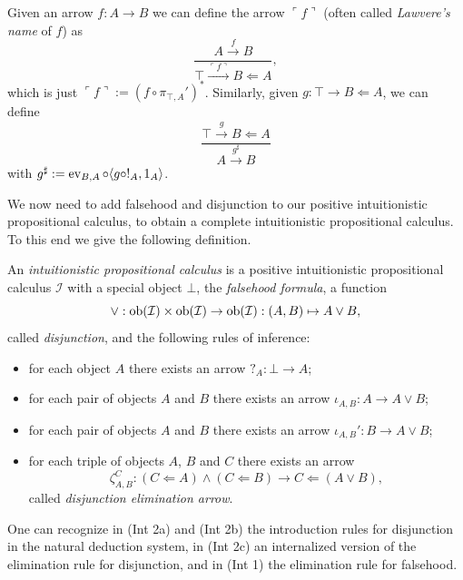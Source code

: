 \begin{example}
    Given an arrow $f : A \to B$ we can define the arrow $\ulcorner f \urcorner$ (often called \emph{Lawvere's name} of $f$) as\label{idx:lawvere-name}
    \[ \frac{A \xrightarrow{f} B}{\top \xrightarrow{\ulcorner f \urcorner} B \Leftarrow A}, \]
    which is just $\ulcorner f \urcorner := (f \circ \pi_{\top,A}')^*$. Similarly, given $g : \top \to B \Leftarrow A$, we can define
    \[ \frac{\top \xrightarrow{g} B \Leftarrow A}{A \xrightarrow{g^\sharp} B} \]
    with $g^\sharp := \operatorname{ev}_{B,A} \circ \langle g \circ !_A,1_A\rangle$.\label{idx:global-evaluation}
\end{example}

We now need to add falsehood and disjunction to our positive intuitionistic propositional calculus, to obtain a complete intuitionistic propositional calculus.
To this end we give the following definition.

\begin{definition}
    An \emph{intuitionistic propositional calculus} is a positive intuitionistic propositional calculus $\mathcal I$ with a special object $\bot$, the \emph{falsehood formula}, a function
    \[ \lor : \operatorname{ob}(\mathcal I)\times\operatorname{ob}(\mathcal I) \to \operatorname{ob}(\mathcal I) : (A,B) \mapsto A \lor B, \]
    called \emph{disjunction}, and the following rules of inference:
    \begin{itemize}
        \item[(\textnormal{Int 1})] for each object $A$ there exists an arrow $?_A : \bot \to A$;
        \item[(\textnormal{Int 2a})] for each pair of objects $A$ and $B$ there exists an arrow $\iota_{A,B} : A \to A \lor B$;
        \item[(\textnormal{Int 2b})] for each pair of objects $A$ and $B$ there exists an arrow $\iota_{A,B}' : B \to A \lor B$;
        \item[(\textnormal{Int 2c})] for each triple of objects $A$, $B$ and $C$ there exists an arrow
        \[ \zeta_{A,B}^C : (C \Leftarrow A) \land (C \Leftarrow B) \to C \Leftarrow (A \lor B),\]
        called \emph{disjunction elimination arrow}.
    \end{itemize}
\end{definition}

\begin{remark}
    One can recognize in (Int 2a) and (Int 2b) the introduction rules for disjunction in the natural deduction system,
    in (Int 2c) an internalized version of the elimination rule for disjunction, and in (Int 1) the elimination rule for falsehood.
\end{remark}

